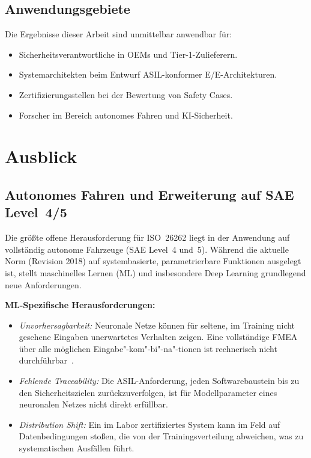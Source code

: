 ﻿\documentclass[a4paper,12pt]{article}
\theoremstyle{definition}
\begin{document}
\subsection{Anwendungsgebiete}

Die Ergebnisse dieser Arbeit sind unmittelbar anwendbar für:
\begin{itemize}
  \item Sicherheitsverantwortliche in OEMs und Tier-1-Zulieferern.
  \item Systemarchitekten beim Entwurf ASIL-konformer
        E/E-Architekturen.
  \item Zertifizierungsstellen bei der Bewertung von Safety Cases.
  \item Forscher im Bereich autonomes Fahren und KI-Sicherheit.
\end{itemize}

\section{Ausblick}

\subsection{Autonomes Fahren und Erweiterung auf SAE Level~4/5}

Die größte offene Herausforderung für ISO~26262 liegt in der Anwendung
auf vollständig autonome Fahrzeuge (SAE Level~4 und~5). Während die
aktuelle Norm (Revision 2018) auf systembasierte, parametrierbare
Funktionen ausgelegt ist, stellt maschinelles Lernen (ML) und
insbesondere Deep Learning grundlegend neue Anforderungen.

\textbf{ML-Spezifische Herausforderungen:}
\begin{itemize}
  \item \emph{Unvorhersagbarkeit:} Neuronale Netze können für seltene,
        im Training nicht gesehene Eingaben unerwartetes Verhalten
        zeigen. Eine vollständige FMEA über alle möglichen
        Eingabe"-kom"-bi"-na"-tionen ist rechnerisch nicht
        durchführbar~\cite{burton_2020}.
  \item \emph{Fehlende Traceability:} Die ASIL-Anforderung, jeden
        Softwarebaustein bis zu den Sicherheitszielen zurückzuverfolgen,
        ist für Modellparameter eines neuronalen Netzes nicht direkt
        erfüllbar.
  \item \emph{Distribution Shift:} Ein im Labor zertifiziertes System
        kann im Feld auf Datenbedingungen stoßen, die von der
        Trainingsverteilung abweichen, was zu systematischen
        Ausfällen führt.
\end{itemize}
\end{document}
